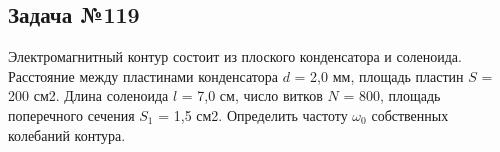 \subsection{Задача №119}

Электромагнитный контур состоит из плоского конденсатора и соленоида. Расстояние между пластинами конденсатора $d$ = 2,0 мм, площадь пластин $S$ = 200 см2. Длина соленоида $l$ = 7,0 см, число витков
$N$ = 800, площадь поперечного сечения $S_1$ = 1,5 см2. Определить частоту $\omega_0$ собственных колебаний контура.